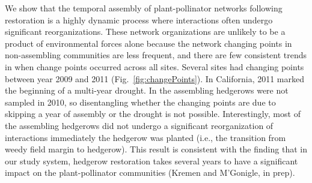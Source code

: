 \documentclass[12pt]{article}
\begin{document}
We show that the temporal assembly of plant-pollinator networks
following restoration is a highly dynamic process where interactions
often undergo significant reorganizations. These network organizations
are unlikely to be a product of environmental forces alone because the
network changing points in non-assembling communities are less
frequent, and there are few consistent trends in when change points
occurred across all sites. Several sites had changing points between
year 2009 and 2011 (Fig.~\ref{fig:changePoints}). In California, 2011
marked the beginning of a multi-year drought. In the assembling
hedgerows were not sampled in 2010, so disentangling whether the
changing points are due to skipping a year of assembly or the drought
is not possible. Interestingly, most of the assembling hedgerows did
not undergo a significant reorganization of interactions immediately
the hedgerow was planted (i.e., the transition from weedy field margin
to hedgerow). This result is consistent with the finding that in our
study system, hedgerow restoration takes several years to have a
significant impact on the plant-pollinator communities (Kremen and
M'Gonigle, in prep).

\end{document}
